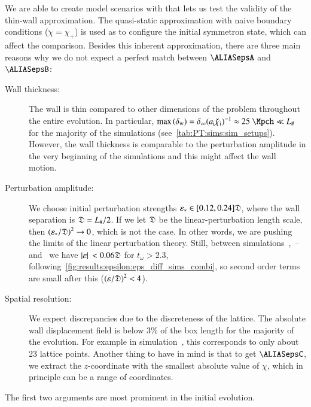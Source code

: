 





We are able to create model scenarios with \asgrd{} that lets us test the validity of the thin-wall approximation. The quasi-static approximation with naive boundary conditions ($\breve{\chi}=\chi_+$) is used as to configure the initial symmetron state, which can affect the comparison. %
Besides this inherent approximation, there are three main reasons why we do not expect a perfect match between $\epsA$ and $\epsB$:
\begin{description}
    \item[Wall thickness:] The wall is thin compared to other dimensions of the problem throughout the entire evolution. In particular, $\max{(\delta\ped{w})}=\delta_\infty  {(a\ped{i}\breve{\chi}\ped{i})}^{-1} \approx 25~\Mpch \ll L_\#$ for the majority of the simulations (see~\cref{tab:PT:sims:sim_setups}). However, the wall thickness is comparable to the perturbation amplitude in the very beginning of the simulations and this might affect the wall motion.
    \item[Perturbation amplitude:] We choose initial perturbation strengths $\varepsilon_\ast\in[0.12, 0.24]\mathfrak{D}$, where the wall separation is $\mathfrak{D}=L_\#/2$. If we let $\mathfrak{D}$ be the linear-perturbation length scale, then ${(\varepsilon_\ast/\mathfrak{D})}^2 \to 0$, which is not the case. 
    In other words, we are pushing the limits of the linear perturbation theory. %
    Still, between simulations~,~-- and~ we have $\abs*{\varepsilon} < 0.06 \mathfrak{D}$ for $t_\omega>2.3$, following~\cref{fig:results:epsilon:eps_diff_sims_combi}, so second order terms are small after this (${(\varepsilon/\mathfrak{D})}^2< 4$\textperthousand).
    \item[Spatial resolution:] We expect discrepancies due to the discreteness of the lattice. The absolute wall displacement field is below 3\% of the box length for the majority of the evolution. For example in simulation~, this corresponds to only about 23 lattice points. 
    Another thing to have in mind is that to get $\epsC$, we extract the $z$-coordinate with the smallest absolute value of $\chi$, which in principle can be a range of coordinates.
\end{description}
The first two arguments are most prominent in the initial evolution. %






